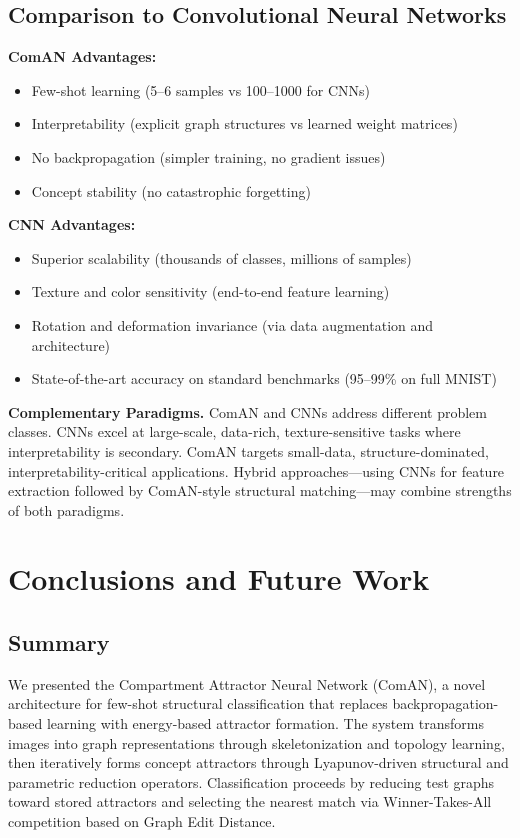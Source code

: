 \documentclass[12pt, a4paper]{article}
\begin{document}
\subsection{Comparison to Convolutional Neural Networks}

\textbf{ComAN Advantages:}
\begin{itemize}
\item Few-shot learning (5--6 samples vs 100--1000 for CNNs)
\item Interpretability (explicit graph structures vs learned weight matrices)
\item No backpropagation (simpler training, no gradient issues)
\item Concept stability (no catastrophic forgetting)
\end{itemize}

\textbf{CNN Advantages:}
\begin{itemize}
\item Superior scalability (thousands of classes, millions of samples)
\item Texture and color sensitivity (end-to-end feature learning)
\item Rotation and deformation invariance (via data augmentation and architecture)
\item State-of-the-art accuracy on standard benchmarks (95--99\% on full MNIST)
\end{itemize}

\textbf{Complementary Paradigms.} ComAN and CNNs address different problem classes. CNNs excel at large-scale, data-rich, texture-sensitive tasks where interpretability is secondary. ComAN targets small-data, structure-dominated, interpretability-critical applications. Hybrid approaches---using CNNs for feature extraction followed by ComAN-style structural matching---may combine strengths of both paradigms.

\section{Conclusions and Future Work}

\subsection{Summary}

We presented the Compartment Attractor Neural Network (ComAN), a novel architecture for few-shot structural classification that replaces backpropagation-based learning with energy-based attractor formation. The system transforms images into graph representations through skeletonization and topology learning, then iteratively forms concept attractors through Lyapunov-driven structural and parametric reduction operators. Classification proceeds by reducing test graphs toward stored attractors and selecting the nearest match via Winner-Takes-All competition based on Graph Edit Distance.
\end{document}
